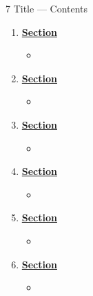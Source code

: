\documentclass[12pt,letterpaper]{article}
\begin{document}
\setcounter{section}{7}


\begin{chapbox}{7 Title --- Contents}{ 
\begin{enumerate}[font=\bfseries, wide]
\item \hyperlink{7.1}{\textbf{Section}}
    \begin{itemize}
        \item 
    \end{itemize}
\item \hyperlink{7.2}{\textbf{Section}}
    \begin{itemize}
        \item
    \end{itemize}
\item \hyperlink{7.3}{\textbf{Section}}
    \begin{itemize}
        \item 
    \end{itemize}
\item \hyperlink{7.4}{\textbf{Section}}
    \begin{itemize}
        \item 
    \end{itemize}
\item \hyperlink{7.5}{\textbf{Section}}
    \begin{itemize}
        \item 
    \end{itemize}
\item \hyperlink{7.6}{\textbf{Section}}
    \begin{itemize}
        \item 
    \end{itemize}
\end{enumerate}
}\end{chapbox}
\end{document}
